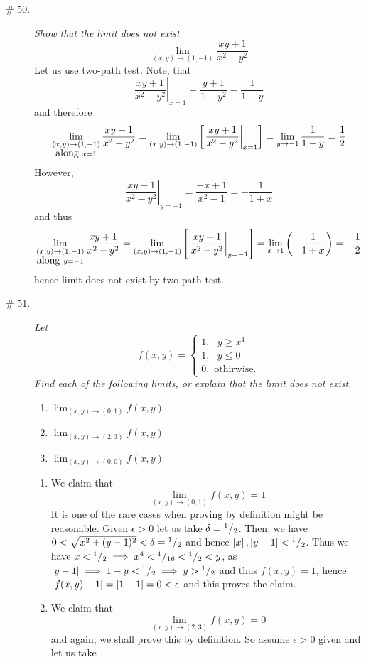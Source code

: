 \documentclass[8pt]{article} %
\begin{document}
\begin{description}
{		}
	\item[\# 50.]{
		\newcommand{\f}{\frac{xy+1}{x^2-y^2}}
		{\it Show that the limit does not exist \[\lim_{(x,y)\to(1,-1)}\frac{xy+1}{x^2-y^2}\]
		}
		Let us use two-path test. Note, that 
		\[\left.\f\right|_{x=1}=\frac{y+1}{1-y^2}=\frac{1}{1-y}\]
		and therefore
		\[\lim_{\begin{subarray}{c}(x,y)\to(1,-1)\\\mbox{along }x=1\end{subarray}}\f=
			\lim_{(x,y)\to(1,-1)}\mysbra{\left.\f\right|_{x=1}}=\lim_{y\to-1}\frac{1}{1-y}=\frac{1}{2}\]
			However, \[\left.\f\right|_{y=-1}=\frac{-x+1}{x^2-1}=-\frac{1}{1+x}\]
		and thus
		\[\lim_{\begin{subarray}{c}(x,y)\to(1,-1)\\\mbox{along }y=-1\end{subarray}}\f=
			\lim_{(x,y)\to(1,-1)}\mysbra{\left.\f\right|_{y=-1}}=\lim_{x\to1}\mybra{-\frac{1}{1+x}}=-\frac{1}{2}\]
		hence limit does not exist by two-path test.
		}
	\item[\# 51.]{{\it Let}
		\[f(x,y)=\begin{cases}1,\mbox{ }y\geq x^4\\1,\mbox{ }y\leq 0\\0,\mbox{ othirwise.}\end{cases}\]
		{\it Find each of the following limits, or explain that the limit does not exist.}
		\begin{enumerate}[\bfseries a.]
			\item $\lim_{(x,y)\to(0,1)}f(x,y)$
			\item $\lim_{(x,y)\to(2,3)}f(x,y)$
			\item $\lim_{(x,y)\to(0,0)}f(x,y)$
		\end{enumerate}
		\begin{enumerate}[\bfseries a.]
			\item We claim that \[\lim_{(x,y)\to(0,1)}f(x,y)=1\]
				It is one of the rare cases when proving by definition might be reasonable. Given $\epsilon>0$ let
				us take $\delta={^{1}/_{2}}$. Then, we have $0<\sqrt{x^2+(y-1)^2}<\delta={^{1}/_{2}}$ and
				hence $\left|x\right|,\left|y-1\right|<{^{1}/_{2}}$. Thus we have $x<{^{1}/_{2}}\implies
				x^4<{^{1}/_{16}}<{^{1}/_{2}}<y$, as $\left|y-1\right|\implies 1-y<{^{1}/_{2}}\implies y>{^{1}/_{2}}$ and thus $f(x,y)=1$, hence $\left|f(x,y)-1\right|=\left|1-1\right|=0<\epsilon$ and this proves the claim.
			\item We claim that \[\lim_{(x,y)\to(2,3)}f(x,y)=0\]
				and again, we shall prove this by definition. So assume $\epsilon>0$ given and let us take

\end{enumerate}}
\end{description}
\end{document}
